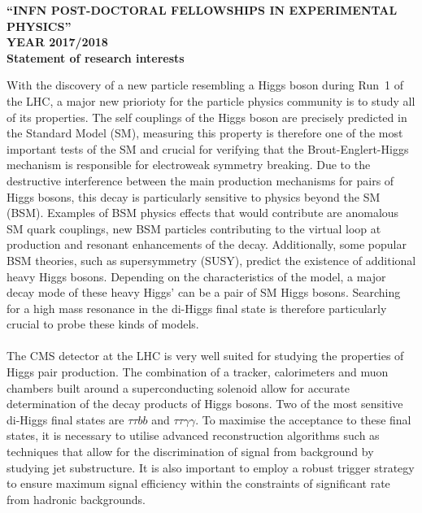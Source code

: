 \documentclass[a4paper]{moderncv}
\title{}%
\begin{document}
\makecvtitle

\vspace{-4.4cm}
\textbf{``INFN POST-DOCTORAL FELLOWSHIPS IN EXPERIMENTAL PHYSICS''}\\
\textbf{YEAR 2017/2018} \\
\textbf{Statement of research interests} 
\vspace{2.5cm}

With the discovery of a new particle resembling a
Higgs boson during Run~1 of the LHC, a major new priorioty for the
particle physics community is to study all of its properties. The self
couplings of the Higgs boson are precisely predicted in the Standard
Model (SM), measuring this property is therefore one of the most
important tests of the SM and crucial for verifying that the
Brout-Englert-Higgs mechanism is responsible for electroweak symmetry
breaking. Due to the destructive interference between the main
production mechanisms for pairs of Higgs bosons, this decay is
particularly sensitive to physics beyond the SM (BSM). Examples of BSM
physics effects that would contribute are anomalous SM quark
couplings, new BSM particles contributing to the virtual loop at
production and resonant enhancements of the decay. Additionally, some popular BSM
theories, such as supersymmetry (SUSY), predict the existence of
additional heavy Higgs bosons. Depending on the characteristics of the
model, a major decay mode of these heavy Higgs' can be a pair of SM Higgs
bosons. Searching for a high mass resonance in the di-Higgs final
state is therefore particularly crucial to probe these kinds of models.
\\\\
The CMS detector at the LHC is very well suited for studying the
properties of Higgs pair production. The combination of a tracker,
calorimeters and muon chambers built around a superconducting solenoid allow for
accurate determination of the decay products of Higgs bosons. Two of
the most sensitive di-Higgs final states are $\tau\tau bb$ and
$\tau\tau\gamma\gamma$. To maximise the acceptance to these final
states, it is necessary to utilise advanced reconstruction algorithms
such as techniques that allow for the discrimination of signal from
background by studying jet substructure. It is also important to
employ a robust trigger strategy to ensure maximum signal efficiency
within the constraints of significant rate from hadronic backgrounds.
\\\\
\end{document}
